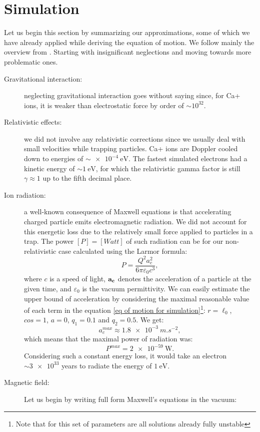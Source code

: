 \section{Simulation}
\label{sec:simulation}

Let us begin this section by summarizing our approximations, some of which we have already applied while deriving the equation of motion. We follow mainly the overview from \cite{Friedman_1982}. Starting with insignificant neglections and moving towards more problematic ones. 
\begin{description}
	\item[Gravitational interaction:] neglecting gravitational interaction goes without saying since, for Ca+ ions, it is weaker than electrostatic force by order of $\sim 10^{32}$.
	\item[Relativistic effects:] we did not involve any relativistic corrections since we usually deal with small velocities while trapping particles. Ca+ ions are Doppler cooled down to energies of $\sim \SI{e-4}{\eV}$. The fastest simulated electrons had a kinetic energy of $\sim \SI{1}{\eV}$, for which the relativistic gamma factor is still $\gamma \approx  1$ up to the fifth decimal place.
	\item[Ion radiation:] a well-known consequence of Maxwell equations is that accelerating charged particle emits electromagnetic radiation. We did not account for this energetic loss due to the relatively small force applied to particles in a trap. The power $[P] = [Watt]$ of such radiation can be for our non-relativistic case calculated using \cite{larmor1897lxiii} the Larmor formula: $$P = \dfrac{Q^2 a_c^2}{6 \pi \varepsilon_0 c^3},$$ where $c$ is a speed of light, $\vb{a_c}$ denotes the acceleration of a particle at the given time, and $\varepsilon_0$ is the vacuum permittivity. We can easily estimate the upper bound of acceleration by considering the maximal reasonable value of each term in the equation \eqref{eq of motion for simulation}\footnote{Note that for this set of parameters are all solutions already fully unstable}: $r = \ell_0$, $cos = 1$, $a = 0$, $q_1 = 0.1$ and $q_2 = 0.5$. We get:  $$a_c^{max} \approx \SI{1.8e-3}{m.s^{-2}},$$ which means that the maximal power of radiation was: $$P^{max} = \SI{2e-59}{\watt}.$$ Considering such a constant energy loss, it would take an electron $\sim\num{3e33}$ years to radiate the energy of $\SI{1}{\electronvolt}$.%
	\item[Magnetic field:] Let us begin by writing full form Maxwell's equations in the vacuum:

\end{description}

